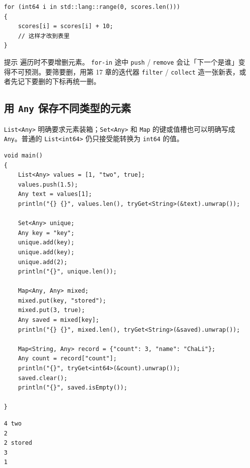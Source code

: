 \par
\medskip
\begin{lstlisting}[style=chali]
for (int64 i in std::lang::range(0, scores.len()))
{
    scores[i] = scores[i] + 10;
    // 这样才改到表里
}
\end{lstlisting}
\par
\medskip

\begin{tip}{提示}
遍历时不要增删元素。 \texttt{for-in} 途中 \texttt{push} / \texttt{remove} 会让「下一个是谁」变得不可预测。要筛要删，用第 17 章的迭代器 \texttt{filter} / \texttt{collect} 造一张新表，或者先记下要删的下标再统一删。
\end{tip}

\subsection*{用 \texttt{Any} 保存不同类型的元素}

\texttt{List<\allowbreak{}Any>\allowbreak{}} 明确要求元素装箱；\texttt{Set<\allowbreak{}Any>\allowbreak{}} 和 \texttt{Map} 的键或值槽也可以明确写成 \texttt{Any}。普通的 \texttt{List<\allowbreak{}int64>\allowbreak{}} 仍只接受能转换为 \texttt{int64} 的值。

\par
\medskip
\begin{lstlisting}[style=chali]
void main()
{
    List<Any> values = [1, "two", true];
    values.push(1.5);
    Any text = values[1];
    println("{} {}", values.len(), tryGet<String>(&text).unwrap());

    Set<Any> unique;
    Any key = "key";
    unique.add(key);
    unique.add(key);
    unique.add(2);
    println("{}", unique.len());

    Map<Any, Any> mixed;
    mixed.put(key, "stored");
    mixed.put(3, true);
    Any saved = mixed[key];
    println("{} {}", mixed.len(), tryGet<String>(&saved).unwrap());

    Map<String, Any> record = {"count": 3, "name": "ChaLi"};
    Any count = record["count"];
    println("{}", tryGet<int64>(&count).unwrap());
    saved.clear();
    println("{}", saved.isEmpty());

}
\end{lstlisting}
\par
\medskip

\par
\medskip
\begin{lstlisting}[style=out]
4 two
2
2 stored
3
1
\end{lstlisting}
\par
\medskip

